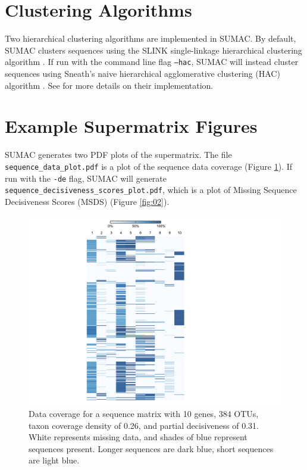 \documentclass[10pt]{report}
\begin{document}
\section{Clustering Algorithms}
Two hierarchical clustering algorithms are implemented in SUMAC.
By default, SUMAC clusters sequences using the SLINK single-linkage hierarchical clustering algorithm \citep{Sibson1973}.
If run with the command line flag \texttt{--hac}, SUMAC will instead cluster sequences using Sneath's naive
hierarchical agglomerative clustering (HAC) algorithm \citep{Sneath1957}.
See \citet{sumac} for more details on their implementation.

\section{Example Supermatrix Figures}

SUMAC generates two PDF plots of the supermatrix. The file \texttt{sequence\_data\_plot.pdf} is a plot of the sequence data coverage (Figure \ref{fig:01}). 
If run with the \texttt{-de} flag, SUMAC will generate \texttt{sequence\_decisiveness\_scores\_plot.pdf}, which is a plot of 
Missing Sequence Decisiveness Scores (MSDS) (Figure \ref{fig:02}).

\begin{figure}[!tpb]
\centerline{\includegraphics[scale=1.0]{figures/sequence_plot.pdf}}
\caption{Data coverage for a sequence matrix with 10 genes, 384 OTUs, taxon coverage density of 0.26, and partial decisiveness of 0.31.
White represents missing data, and shades of blue represent sequences present. Longer sequences are dark blue, short sequences
are light blue.} \label{fig:01}
\end{figure}
\end{document}

